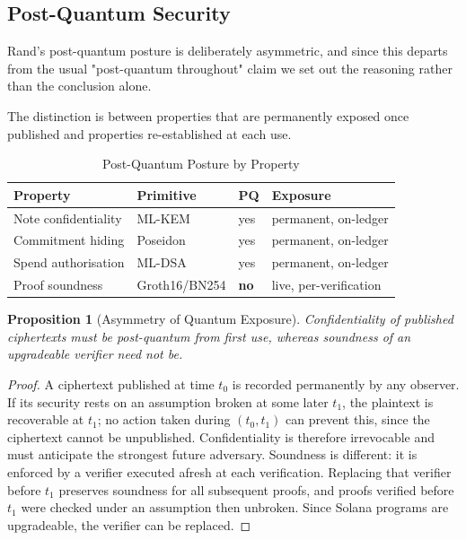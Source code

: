 \documentclass[11pt,a4paper]{article}
\newtheorem{proposition}[theorem]{Proposition}
\begin{document}
\subsection{Post-Quantum Security}

\label{sec:pqposture}

Rand's post-quantum posture is deliberately asymmetric, and since this departs from the usual "post-quantum throughout" claim we set out the reasoning rather than the conclusion alone.

The distinction is between properties that are permanently exposed once published and properties re-established at each use.

\begin{table}[H]
\centering
\caption{Post-Quantum Posture by Property}
\begin{tabular}{@{}llll@{}}
\toprule
\textbf{Property} & \textbf{Primitive} & \textbf{PQ} & \textbf{Exposure} \\ \midrule
Note confidentiality & ML-KEM & yes & permanent, on-ledger \\
Commitment hiding & Poseidon & yes & permanent, on-ledger \\
Spend authorisation & ML-DSA & yes & permanent, on-ledger \\
Proof soundness & Groth16/BN254 & \textbf{no} & live, per-verification \\ \bottomrule
\end{tabular}
\end{table}

\begin{proposition}[Asymmetry of Quantum Exposure]
Confidentiality of published ciphertexts must be post-quantum from first use, whereas soundness of an upgradeable verifier need not be.
\end{proposition}

\begin{proof}
A ciphertext published at time $t_0$ is recorded permanently by any observer. If its security rests on an assumption broken at some later $t_1$, the plaintext is recoverable at $t_1$; no action taken during $(t_0, t_1)$ can prevent this, since the ciphertext cannot be unpublished. Confidentiality is therefore irrevocable and must anticipate the strongest future adversary. Soundness is different: it is enforced by a verifier executed afresh at each verification. Replacing that verifier before $t_1$ preserves soundness for all subsequent proofs, and proofs verified before $t_1$ were checked under an assumption then unbroken. Since Solana programs are upgradeable, the verifier can be replaced.
\end{proof}
\end{document}
